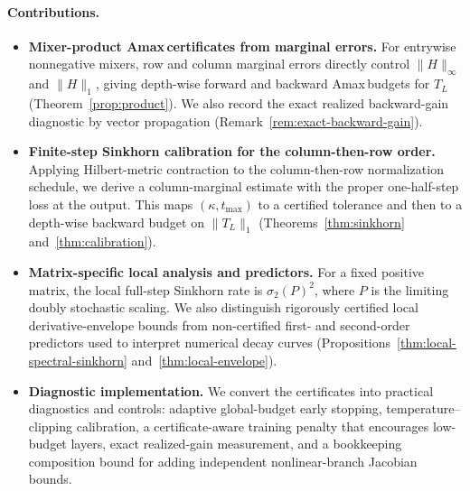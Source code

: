\documentclass[11pt]{article}
\numberwithin{equation}{section}
\theoremstyle{plain}
\theoremstyle{definition}
\theoremstyle{remark}
\newcommand{\Amax}{\textsf{Amax}\,}
\begin{document}
\paragraph{Contributions.}\label{subsec:intro_contrib}
\begin{itemize}[leftmargin=*, itemsep=0.25em]
\item \textbf{Mixer-product \Amax certificates from marginal errors.}
For entrywise nonnegative mixers, row and column marginal errors directly
control \(\|H\|_\infty\) and \(\|H\|_1\), giving depth-wise forward and
backward \Amax budgets for \(T_L\) (Theorem~\ref{prop:product}).  We also
record the exact realized backward-gain diagnostic by vector propagation
(Remark~\ref{rem:exact-backward-gain}).

\item \textbf{Finite-step Sinkhorn calibration for the column-then-row order.}
Applying Hilbert-metric contraction to the column-then-row normalization schedule,
we derive a column-marginal estimate with the proper one-half-step loss at the
output.  This maps \((\kappa,t_{\max})\) to a certified tolerance and then to a
depth-wise backward budget on \(\|T_L\|_1\) (Theorems~\ref{thm:sinkhorn}
and~\ref{thm:calibration}).

\item \textbf{Matrix-specific local analysis and predictors.}
For a fixed positive matrix, the local full-step Sinkhorn rate is
\(\sigma_2(P)^2\), where \(P\) is the limiting doubly stochastic scaling.  We
also distinguish rigorously certified local derivative-envelope bounds from
non-certified first- and second-order predictors used to interpret numerical
decay curves (Propositions~\ref{thm:local-spectral-sinkhorn}
and~\ref{thm:local-envelope}).

\item \textbf{Diagnostic implementation.}
We convert the certificates into practical diagnostics and controls: adaptive
global-budget early stopping, temperature--clipping calibration, a
certificate-aware training penalty that encourages low-budget layers, exact
realized-gain measurement, and a bookkeeping composition bound for adding
independent nonlinear-branch Jacobian bounds.
\end{itemize}
\end{document}
